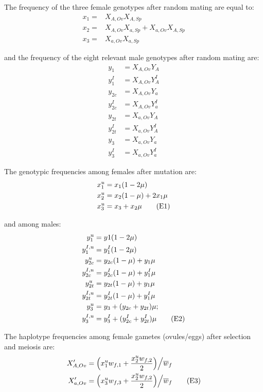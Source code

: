 \documentclass{article}
\newcommand\numberthis{\addtocounter{equation}{1}\tag{\theequation}}
\begin{document}
\begin{appendices}
\noindent The frequency of the three female genotypes after random mating are equal to:
\begin{align*}
		x_1 = & X_{A,Ov}  X_{A,Sp} \\
		x_2 = & X_{A,Ov}  X_{a,Sp} + X_{a,Ov} X_{A,Sp} \\
		x_3 = & X_{a,Ov}  X_{a,Sp} 
\end{align*}

\noindent and the frequency of the eight relevant male genotypes after random mating are:
\begin{align*}
		y_1      &= X_{A,Ov} Y_A \\
		y^I_1    &= X_{A,Ov} Y^I_A \\
		y_{2c}   &= X_{A,Ov} Y_a \\
		y^I_{2c} &= X_{A,Ov} Y^I_a \\
		y_{2t}   &= X_{a,Ov} Y_A \\
		y^I_{2t} &= X_{a,Ov} Y^I_A \\
		y_{3}    &= X_{a,Ov} Y_a \\
		y^I_{3}  &= X_{a,Ov} Y^I_a 
\end{align*}

\noindent The genotypic frequencies among females after mutation are:
\begin{align*}
	x^u_{1} &= x_1 (1 - 2 \mu) \\
	x^u_{2} &= x_2 (1 - \mu) + 2 x_1 \mu \\
	x^u_{3} &= x_3 + x_2 \mu \numberthis
\end{align*}

\noindent and among males:
\begin{align*}
	y^u_{1}      &= y1 (1 - 2 \mu) \\
	y^{I,u}_{1}  &= y^I_1 (1 - 2 \mu) \\
	y^u_{2c}     &= y_{2c} (1 - \mu) + y_1 \mu \\
	y^{I,u}_{2c} &= y^{I}_{2c} (1 - \mu) + y^I_1 \mu \\
	y^u_{2t}     &= y_{2t} (1 - \mu) + y_1 \mu \\
	y^{I,u}_{2t} &= y^I_{2t} (1 - \mu) + y^I_1 \mu \\
	y^u_{3}      &= y_3 + (y_{2c} + y_{2t}) \mu; \\
	y^{I,u}_{3}  &= y^I_3 + (y^I_{2c} + y^I_{2t}) \mu  \numberthis
\end{align*}

\noindent The haplotype frequencies among female gametes (ovules/eggs) after selection and meiosis are:
\begin{align*}
	X_{A,Ov}^{\prime} &= \Big( x^u_{1} w_{f,1} + \frac{x^u_{2} w_{f,2} }{2} \Big) \Big/ \overline{w}_f \\
	X_{a,Ov}^{\prime} &= \Big( x^u_{3} w_{f,3} + \frac{x^u_{2} w_{f,2} }{2} \Big) \Big/ \overline{w}_f  \numberthis
\end{align*}


\end{appendices}
\end{document}
